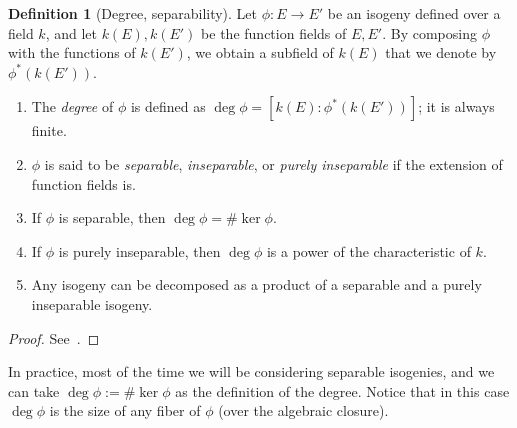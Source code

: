 \documentclass[10pt]{article}
\theoremstyle{plain}
\theoremstyle{definition}
\newtheorem{definition}[theorem]{Definition}
\begin{document}
\begin{definition}[Degree, separability]\label{def:degsep}
  Let $ϕ:E\to E'$ be an isogeny defined over a field $k$, and let
  $k(E),k(E')$ be the function fields of $E,E'$. %
  By composing $\phi$ with the functions of $k(E')$, we obtain a
  subfield of $k(E)$ that we denote by $ϕ^\ast(k(E'))$.

  \begin{enumerate}
  \item The \emph{degree} of $ϕ$ is defined as
    $\deg ϕ = [k(E):ϕ^\ast(k(E'))]$; it is always finite.
  \item $ϕ$ is said to be \emph{separable}, \emph{inseparable}, or
    \emph{purely inseparable} if the extension of function fields is.
  \item If $ϕ$ is separable, then $\deg ϕ = \#\ker ϕ$.
  \item If $ϕ$ is purely inseparable, then $\deg ϕ$ is a power of the
    characteristic of $k$.
  \item Any isogeny can be decomposed as a product of a separable and
    a purely inseparable isogeny.
  \end{enumerate}
\end{definition}
\begin{proof}
  See~\cite[II, Th.~2.4]{silverman:elliptic}.
\end{proof}

In practice, most of the time we will be considering separable
isogenies, and we can take $\deg ϕ := \#\ker ϕ$ as the definition of
the degree. %
Notice that in this case $\deg ϕ$ is the size of any fiber of $ϕ$
(over the algebraic closure). %
\end{document}
